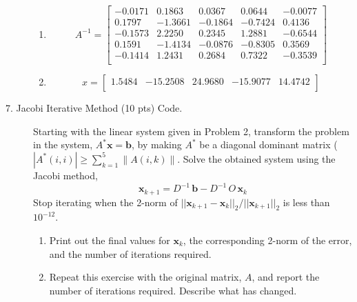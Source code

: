 \documentclass[12pt]{article}
\newcommand{\B}[1]{{\bm #1}}
\begin{document}
\begin{description}
\begin{enumerate}[label=(\textbf{\alph*})]
    \item
    \begin{equation*}
    A^{-1}=
        \left[
                        \begin{array}{ccccc}
      		 -0.0171        &      0.1863       &       0.0367   &      0.0644      &       -0.0077  \\
     		 0.1797        &      -1.3661      &       -0.1864   &      -0.7424      &       0.4136   \\
     		  -0.1573        &      2.2250       &       0.2345   &      1.2881       &       -0.6544  \\
     		  0.1591        &      -1.4134       &       -0.0876   &      -0.8305       &       0.3569   \\
     		  -0.1414        &      1.2431       &       0.2684   &      0.7322       &       -0.3539   \\
          \end{array}
        \right]
    \end{equation*}
    \item
     \begin{equation*}
    x =
    \left[
          \begin{array}{ccccc}
               1.5484 & -15.2508 & 24.9680 & -15.9077 &   14.4742 \\
          \end{array}
        \right] 
    \end{equation*}
    \end{enumerate}
       
    
\color{black}
\fi

\item[7. Jacobi Iterative Method (10 pts) Code.] Starting with the linear system given in Problem 2, transform the problem in the system, $A^* \B{x} = \B{b}$, by making $A^*$ be a diagonal dominant matrix ($|A^*(i, i)| \ge \sum_{k = 1}^5 \| A(i, k) \|$. Solve the obtained system using the Jacobi method,
    \begin{equation*}
        \B{x}_{k + 1} = D^{-1} \, \B{b} - D^{-1} \, O \, \B{x}_k
    \end{equation*}
    Stop iterating when the 2-norm of $|| \B{x}_{k + 1} -  \B{x}_k ||_2 / || \B{x}_{k + 1} ||_2$ is less than $10^{-12}$.
    \begin{enumerate} [label=(\alph*)]
	\item Print out the final values for $\B{x}_k$, the corresponding 2-norm of the error, and the number of iterations required.
	\item Repeat this exercise with the original matrix, $A$, and report the number of iterations required. Describe what has changed.
\end{enumerate}
    

\end{description}
\end{document}
